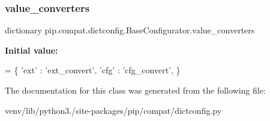 \subsubsection{\texorpdfstring{value\+\_\+converters}{value\_converters}}
{\footnotesize\ttfamily dictionary pip.\+compat.\+dictconfig.\+Base\+Configurator.\+value\+\_\+converters\hspace{0.3cm}{\ttfamily [static]}}

{\bfseries Initial value\+:}
\begin{DoxyCode}
=  \{
        \textcolor{stringliteral}{'ext'} : \textcolor{stringliteral}{'ext\_convert'},
        \textcolor{stringliteral}{'cfg'} : \textcolor{stringliteral}{'cfg\_convert'},
    \}
\end{DoxyCode}


The documentation for this class was generated from the following file\+:\begin{DoxyCompactItemize}
\item 
venv/lib/python3./site-\/packages/pip/compat/dictconfig.\+py\end{DoxyCompactItemize}
